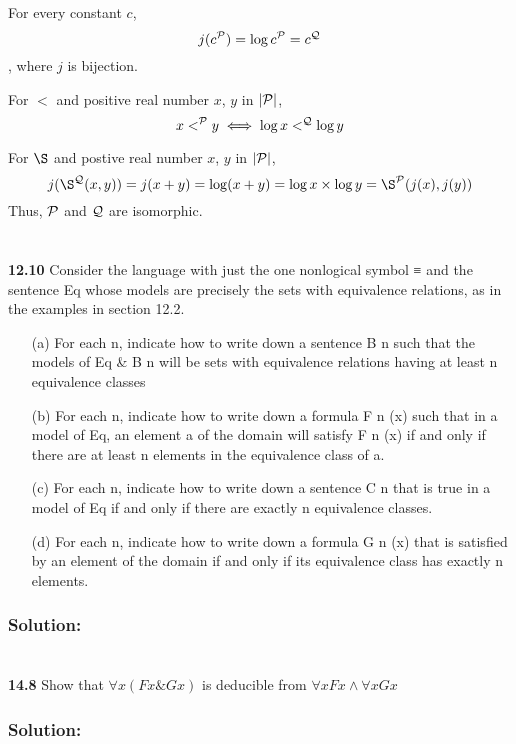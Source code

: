 \documentclass{ctexart}
\begin{document}
For every constant $c$,
$$
j(c^{\cal P}) = \log c^{\cal P} = c^{\cal Q}
$$
, where $j$ is bijection.

For $<$ and positive real number $x$, $y$ in $|\cal P|$,
$$
x <^{\cal P} y \iff \log x <^{\cal Q} \log y
$$

For $\S$ and postive real number $x$, $y$ in $|\cal P|$,
$$
j(\S^{\cal Q}(x, y)) = j(x + y) =  \log(x + y) =  \log x \times \log y =  \S^{\cal P}(j(x), j(y))
$$
Thus, $\cal P$ and $\cal Q$ are isomorphic.

\section*{}
\textbf{12.10} Consider the language with just the one nonlogical symbol ≡ and the sentence
Eq whose models are precisely the sets with equivalence relations, as in the
examples in section 12.2.
\begin{itemize}
\item[(a)] For each n, indicate how to write down a sentence B n such that the
models of Eq \& B n will be sets with equivalence relations having at least
n equivalence classes
\item[(b)] For each n, indicate how to write down a formula F n (x) such that in a
model of Eq, an element a of the domain will satisfy F n (x) if and only if
there are at least n elements in the equivalence class of a.
\item[(c)] For each n, indicate how to write down a sentence C n that is true in a
model of Eq if and only if there are exactly n equivalence classes.
\item[(d)] For each n, indicate how to write down a formula G n (x) that is satisfied
by an element of the domain if and only if its equivalence class has
exactly n elements.
\end{itemize}

\subsubsection*{Solution:}

\section*{}
\textbf{14.8}
Show that $\forall x (Fx \& Gx)$ is deducible from $\forall xFx \land \forall xGx$

\subsubsection*{Solution:}
\end{document}
